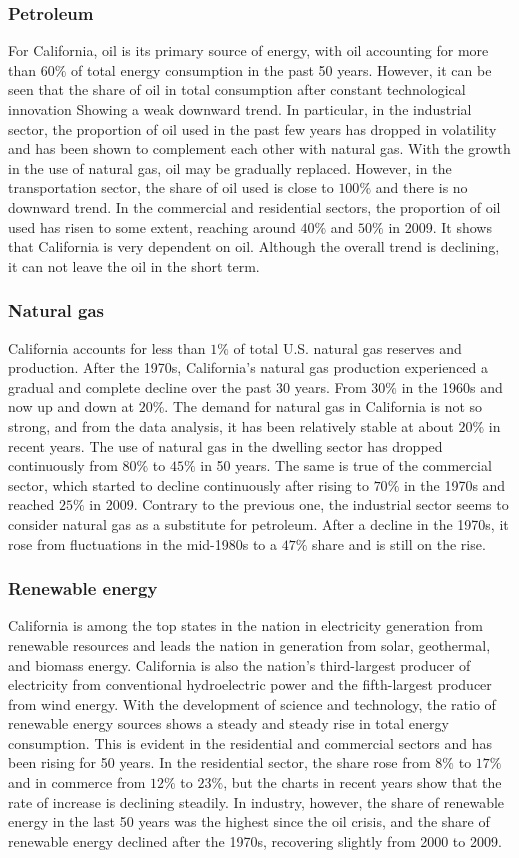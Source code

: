 \documentclass{mcmthesis}
\begin{document}
\subsubsection{Petroleum}
  For California, oil is its primary source of energy, with oil accounting for more than $60\%$ of total energy consumption in the past 50 years. However, it can be seen that the share of oil in total consumption after constant technological innovation Showing a weak downward trend. In particular, in the industrial sector, the proportion of oil used in the past few years has dropped in volatility and has been shown to complement each other with natural gas. With the growth in the use of natural gas, oil may be gradually replaced. However, in the transportation sector, the share of oil used is close to $100\%$ and there is no downward trend. In the commercial and residential sectors, the proportion of oil used has risen to some extent, reaching around $40\%$ and $50\%$ in 2009. It shows that California is very dependent on oil. Although the overall trend is declining, it can not leave the oil in the short term.
\subsubsection{Natural gas}
  California accounts for less than $1\%$ of total U.S. natural gas reserves and production. After the 1970s, California's natural gas production experienced a gradual and complete decline over the past 30 years. From $30\%$ in the 1960s and now up and down at $20\%$. The demand for natural gas in California is not so strong, and from the data analysis, it has been relatively stable at about $20\%$ in recent years. The use of natural gas in the dwelling sector has dropped continuously from $80\%$ to $45\%$ in 50 years. The same is true of the commercial sector, which started to decline continuously after rising to $70\%$ in the 1970s and reached $25\%$ in 2009. Contrary to the previous one, the industrial sector seems to consider natural gas as a substitute for petroleum. After a decline in the 1970s, it rose from fluctuations in the mid-1980s to a $47\%$ share and is still on the rise.
\subsubsection{Renewable energy}
  California is among the top states in the nation in electricity generation from renewable resources and leads the nation in generation from solar, geothermal, and biomass energy. California is also the nation's third-largest producer of electricity from conventional hydroelectric power and the fifth-largest producer from wind energy. With the development of science and technology, the ratio of renewable energy sources shows a steady and steady rise in total energy consumption. This is evident in the residential and commercial sectors and has been rising for 50 years. In the residential sector, the share rose from $8\%$ to $17\%$ and in commerce from $12\%$ to $23\%$, but the charts in recent years show that the rate of increase is declining steadily. In industry, however, the share of renewable energy in the last 50 years was the highest since the oil crisis, and the share of renewable energy declined after the 1970s, recovering slightly from 2000 to 2009.
\end{document}
